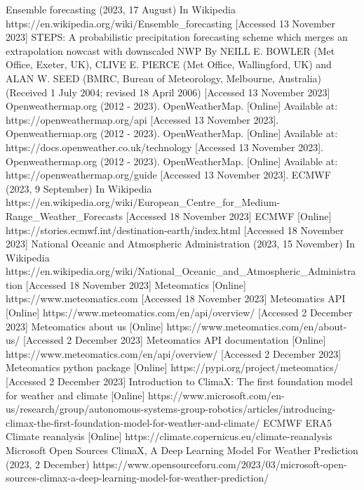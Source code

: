 \documentclass[../paper.tex]{subfiles}
\begin{document}
\begin{thebibliography}{00}
     Ensemble forecasting (2023, 17 August) In Wikipedia https://en.wikipedia.org/wiki/Ensemble\_forecasting [Accessed 13 November 2023]
     STEPS:
    A probabilistic precipitation forecasting scheme which merges an extrapolation nowcast with downscaled NWP
    By NEILL E. BOWLER (Met Office, Exeter, UK), CLIVE E. PIERCE (Met Office, Wallingford, UK) and ALAN W. SEED (BMRC,
    Bureau of Meteorology, Melbourne, Australia)
    (Received 1 July 2004; revised 18 April 2006) [Accessed 13 November 2023]
     Openweathermap.org (2012 - 2023).
    OpenWeatherMap.
    [Online] Available at: https://openweathermap.org/api [Accessed 13 November 2023].
     Openweathermap.org (2012 - 2023).
    OpenWeatherMap.
    [Online] Available at: https://docs.openweather.co.uk/technology [Accessed 13 November 2023].
     Openweathermap.org (2012 - 2023).
    OpenWeatherMap.
    [Online] Available at: https://openweathermap.org/guide [Accessed 13 November 2023].
     ECMWF (2023, 9 September) In Wikipedia https://en.wikipedia.org/wiki/European\_Centre\_for\_Medium-Range\_Weather\_Forecasts [Accessed 18 November 2023]
     ECMWF [Online] https://stories.ecmwf.int/destination-earth/index.html [Accessed 18 November 2023]
     National Oceanic and Atmospheric Administration (2023, 15 November) In Wikipedia
    https://en.wikipedia.org/wiki/National\_Oceanic\_and\_Atmospheric\_Administration [Accessed 18 November 2023]
     Meteomatics [Online] https://www.meteomatics.com [Accessed 18 November 2023]
     Meteomatics API [Online] https://www.meteomatics.com/en/api/overview/ [Accessed 2 December 2023]
     Meteomatics about us [Online] https://www.meteomatics.com/en/about-us/ [Accessed 2 December 2023]
     Meteomatics API documentation [Online] https://www.meteomatics.com/en/api/overview/ [Accessed 2 December 2023]
     Meteomatics python package [Online] https://pypi.org/project/meteomatics/ [Accessed 2 December 2023]
     Introduction to ClimaX: The first foundation model for weather and climate [Online] https://www.microsoft.com/en-us/research/group/autonomous-systems-group-robotics/articles/introducing-climax-the-first-foundation-model-for-weather-and-climate/
     ECMWF ERA5 Climate reanalysis [Online] https://climate.copernicus.eu/climate-reanalysis
     Microsoft Open Sources ClimaX, A Deep Learning Model For Weather Prediction (2023, 2 December) https://www.opensourceforu.com/2023/03/microsoft-open-sources-climax-a-deep-learning-model-for-weather-prediction/

\end{thebibliography}
\end{document}
